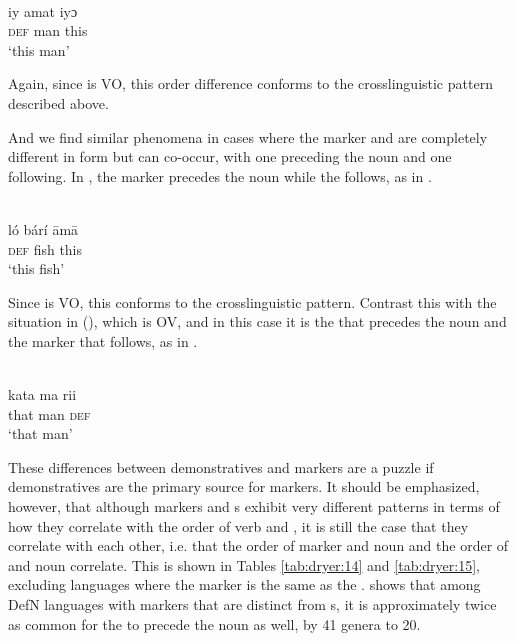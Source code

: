 \documentclass[output=paper]{langsci/langscibook}
\begin{document}
\ea\label{ex:dryer:40}
\\
\gll   iy   amat   iyɔ\\
       \textsc{def}   man   this \\
\glt   ‘this man’
\z

\noindent Again, since  is VO, this order difference conforms to the crosslinguistic pattern described above.

And we find similar phenomena in cases where the  marker and  are completely different in form but can co-occur, with one preceding the noun and one following. In , the  marker precedes the noun while the  follows, as in .

\ea\label{ex:dryer:41}
\\
\gll   ló   bárí   āmā \\
       \textsc{def}   fish   this \\
\glt   ‘this fish’
\z

\noindent Since  is VO, this conforms to the crosslinguistic pattern. Contrast this with the situation in  (), which is OV, and in this case it is the  that precedes the noun and the  marker that follows, as in .

\ea\label{ex:dryer:42}
\\
\gll   kata  ma  rii\\
       that  man  \textsc{def}\\
\glt   ‘that man’
\z

These differences between demonstratives and  markers are a puzzle if demonstratives are the primary  source for  markers. It should be emphasized, however, that although  markers and s exhibit very different patterns in terms of how they correlate with the order of verb and , it is still the case that they correlate with each other, i.e. that the order of  marker and noun and the order of  and noun correlate. This is shown in Tables \ref{tab:dryer:14} and \ref{tab:dryer:15}, excluding languages where the  marker is the same as the .  shows that among DefN languages with  markers that are distinct from s, it is approximately twice as common for the  to precede the noun as well, by 41 genera to 20.
\end{document}
